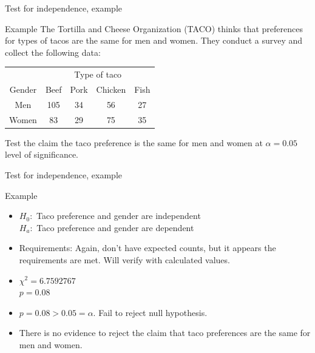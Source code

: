 \documentclass[xcolor=table]{beamer}
\begin{document}
\begin{frame}{Test for independence, example}
\begin{exampleblock}{Example}
The Tortilla and Cheese Organization (TACO) thinks that preferences for types of tacos are the same for men and women. They conduct a survey and collect the following data:\\
\medskip
{\centering
\begin{tabular}{c | c  c c c}
\multicolumn{1}{c}{} & \multicolumn{4}{c}{\large Type of taco}\\
Gender & Beef & Pork & Chicken & Fish\\
\hline
Men & 105 & 34 & 56 & 27\\
Women & 83 & 29 & 75 & 35 \\
\end{tabular}
\par}
\bigskip
Test the claim the taco preference is the same for men and women at $\alpha = 0.05$ level of significance.
\end{exampleblock}
\end{frame}

\begin{frame}{Test for independence, example}
\begin{exampleblock}{Example}
\begin{itemize}
\pause\item $H_0:$ Taco preference and gender are independent\\
$H_a:$ Taco preference and gender are dependent
\pause\item Requirements: Again, don't have expected counts, but it appears the requirements are met. Will verify with calculated values.
\pause\item $\chi^2 = 6.7592767$\\
$p = 0.08 $
\pause\item $p = 0.08 > 0.05 = \alpha$. Fail to reject null hypothesis.
\pause\item There is no evidence to reject the claim that taco preferences are the same for men and women.
\end{itemize}
\end{exampleblock}
\end{frame}
\end{document}

